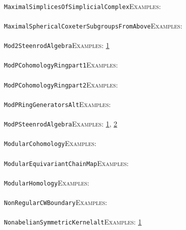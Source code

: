 \documentclass[a4paper,11pt]{report}
\begin{document}
{{ \\
 \texttt{MaximalSimplicesOfSimplicialComplex}{\nobreakspace}{\nobreakspace}{\nobreakspace}{\nobreakspace}\textsc{Examples:} \\
 \\
 \texttt{MaximalSphericalCoxeterSubgroupsFromAbove}{\nobreakspace}{\nobreakspace}{\nobreakspace}{\nobreakspace}\textsc{Examples:} \\
 \\
 \texttt{Mod2SteenrodAlgebra}{\nobreakspace}{\nobreakspace}{\nobreakspace}{\nobreakspace}\textsc{Examples:} \href{../www/SideLinks/About/aboutModPRings.html} {1}{\nobreakspace} \\
 \\
 \texttt{ModPCohomologyRing{\textunderscore}part{\textunderscore}1}{\nobreakspace}{\nobreakspace}{\nobreakspace}{\nobreakspace}\textsc{Examples:} \\
 \\
 \texttt{ModPCohomologyRing{\textunderscore}part{\textunderscore}2}{\nobreakspace}{\nobreakspace}{\nobreakspace}{\nobreakspace}\textsc{Examples:} \\
 \\
 \texttt{ModPRingGeneratorsAlt}{\nobreakspace}{\nobreakspace}{\nobreakspace}{\nobreakspace}\textsc{Examples:} \\
 \\
 \texttt{ModPSteenrodAlgebra}{\nobreakspace}{\nobreakspace}{\nobreakspace}{\nobreakspace}\textsc{Examples:} \href{tutorial/chap7.html} {1}{\nobreakspace}, \href{../www/SideLinks/About/aboutModPRings.html} {2}{\nobreakspace} \\
 \\
 \texttt{ModularCohomology}{\nobreakspace}{\nobreakspace}{\nobreakspace}{\nobreakspace}\textsc{Examples:} \\
 \\
 \texttt{ModularEquivariantChainMap}{\nobreakspace}{\nobreakspace}{\nobreakspace}{\nobreakspace}\textsc{Examples:} \\
 \\
 \texttt{ModularHomology}{\nobreakspace}{\nobreakspace}{\nobreakspace}{\nobreakspace}\textsc{Examples:} \\
 \\
 \texttt{NonRegularCWBoundary}{\nobreakspace}{\nobreakspace}{\nobreakspace}{\nobreakspace}\textsc{Examples:} \\
 \\
 \texttt{NonabelianSymmetricKernel{\textunderscore}alt}{\nobreakspace}{\nobreakspace}{\nobreakspace}{\nobreakspace}\textsc{Examples:} \href{../www/SideLinks/About/aboutIntro.html} {1}{\nobreakspace} \\
}}
\end{document}
